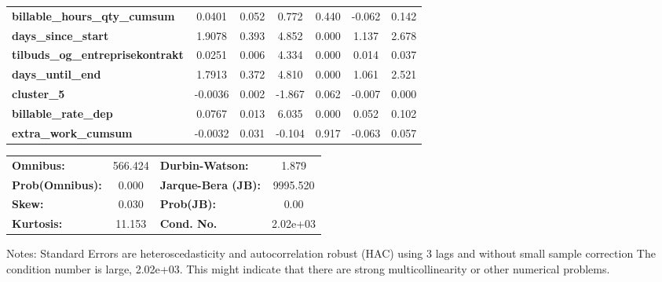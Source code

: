 \begin{center}
\begin{tabular}{lcccccc}
\textbf{billable\_hours\_qty\_cumsum}    &       0.0401  &        0.052     &     0.772  &         0.440        &       -0.062    &        0.142     \\
\textbf{days\_since\_start}              &       1.9078  &        0.393     &     4.852  &         0.000        &        1.137    &        2.678     \\
\textbf{tilbuds\_og\_entreprisekontrakt} &       0.0251  &        0.006     &     4.334  &         0.000        &        0.014    &        0.037     \\
\textbf{days\_until\_end}                &       1.7913  &        0.372     &     4.810  &         0.000        &        1.061    &        2.521     \\
\textbf{cluster\_5}                      &      -0.0036  &        0.002     &    -1.867  &         0.062        &       -0.007    &        0.000     \\
\textbf{billable\_rate\_dep}             &       0.0767  &        0.013     &     6.035  &         0.000        &        0.052    &        0.102     \\
\textbf{extra\_work\_cumsum}             &      -0.0032  &        0.031     &    -0.104  &         0.917        &       -0.063    &        0.057     \\
\bottomrule
\end{tabular}
\begin{tabular}{lclc}
\textbf{Omnibus:}       & 566.424 & \textbf{  Durbin-Watson:     } &    1.879  \\
\textbf{Prob(Omnibus):} &   0.000 & \textbf{  Jarque-Bera (JB):  } & 9995.520  \\
\textbf{Skew:}          &   0.030 & \textbf{  Prob(JB):          } &     0.00  \\
\textbf{Kurtosis:}      &  11.153 & \textbf{  Cond. No.          } & 2.02e+03  \\
\bottomrule
\end{tabular}
\end{center}

Notes: \newline
 [1] Standard Errors are heteroscedasticity and autocorrelation robust (HAC) using 3 lags and without small sample correction \newline
 [2] The condition number is large, 2.02e+03. This might indicate that there are \newline
 strong multicollinearity or other numerical problems.